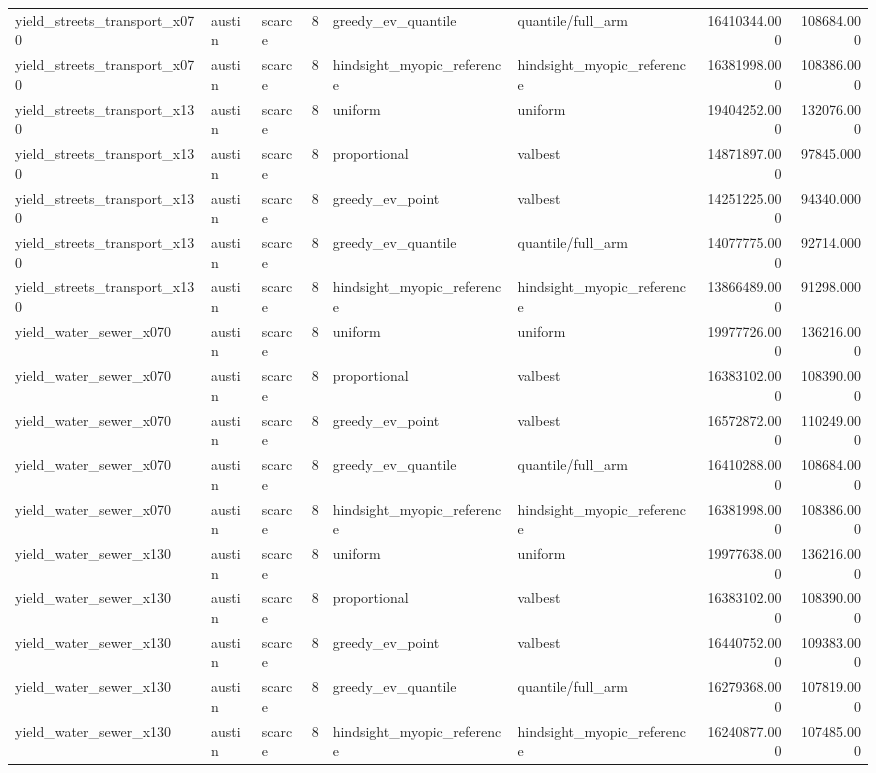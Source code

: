 \begin{tabular}{lllrllrr}
yield\_streets\_transport\_x070 & austin & scarce & 8 & greedy\_ev\_quantile & quantile/full\_arm & 16410344.000 & 108684.000 \\
yield\_streets\_transport\_x070 & austin & scarce & 8 & hindsight\_myopic\_reference & hindsight\_myopic\_reference & 16381998.000 & 108386.000 \\
yield\_streets\_transport\_x130 & austin & scarce & 8 & uniform & uniform & 19404252.000 & 132076.000 \\
yield\_streets\_transport\_x130 & austin & scarce & 8 & proportional & valbest & 14871897.000 & 97845.000 \\
yield\_streets\_transport\_x130 & austin & scarce & 8 & greedy\_ev\_point & valbest & 14251225.000 & 94340.000 \\
yield\_streets\_transport\_x130 & austin & scarce & 8 & greedy\_ev\_quantile & quantile/full\_arm & 14077775.000 & 92714.000 \\
yield\_streets\_transport\_x130 & austin & scarce & 8 & hindsight\_myopic\_reference & hindsight\_myopic\_reference & 13866489.000 & 91298.000 \\
yield\_water\_sewer\_x070 & austin & scarce & 8 & uniform & uniform & 19977726.000 & 136216.000 \\
yield\_water\_sewer\_x070 & austin & scarce & 8 & proportional & valbest & 16383102.000 & 108390.000 \\
yield\_water\_sewer\_x070 & austin & scarce & 8 & greedy\_ev\_point & valbest & 16572872.000 & 110249.000 \\
yield\_water\_sewer\_x070 & austin & scarce & 8 & greedy\_ev\_quantile & quantile/full\_arm & 16410288.000 & 108684.000 \\
yield\_water\_sewer\_x070 & austin & scarce & 8 & hindsight\_myopic\_reference & hindsight\_myopic\_reference & 16381998.000 & 108386.000 \\
yield\_water\_sewer\_x130 & austin & scarce & 8 & uniform & uniform & 19977638.000 & 136216.000 \\
yield\_water\_sewer\_x130 & austin & scarce & 8 & proportional & valbest & 16383102.000 & 108390.000 \\
yield\_water\_sewer\_x130 & austin & scarce & 8 & greedy\_ev\_point & valbest & 16440752.000 & 109383.000 \\
yield\_water\_sewer\_x130 & austin & scarce & 8 & greedy\_ev\_quantile & quantile/full\_arm & 16279368.000 & 107819.000 \\
yield\_water\_sewer\_x130 & austin & scarce & 8 & hindsight\_myopic\_reference & hindsight\_myopic\_reference & 16240877.000 & 107485.000 \\

\end{tabular}
